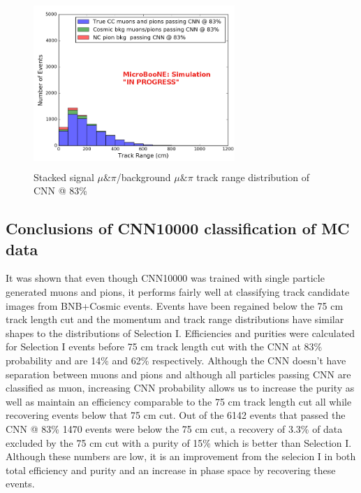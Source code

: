 \begin{figure}[htp!]
\centering
\includegraphics[width=3in,height=2.5in]{figs/sel1mod_trackrange_acc83.png}
	\caption{Stacked signal $\mu \& \pi$/background $\mu \& \pi$ track range distribution of CNN @ 83\%}
\label{fig:sel1mod_83}
\end{figure}
\subsection{Conclusions of CNN10000 classification of MC data}

It was shown that even though CNN10000 was trained with single particle generated muons and pions, it performs fairly well at classifying track candidate images from BNB+Cosmic events. Events have been regained below the 75 cm track length cut and the momentum and track range distributions have similar shapes to the distributions of Selection I. Efficiencies and purities were calculated for Selection I events before 75 cm track length cut  with the CNN at 83\% probability and are 14\% and 62\% respectively. Although the CNN doesn't have separation between muons and pions and although all particles passing CNN are classified as muon, increasing CNN probability allows us to increase the purity as well as maintain an efficiency comparable to the 75 cm track length cut all while recovering events below that 75 cm cut. Out of the 6142 events that passed the CNN @ 83\% 1470 events were below the 75 cm cut, a recovery of 3.3\% of data excluded by the 75 cm cut with a purity of 15\% which is better than Selection I. Although these numbers are low, it is an improvement from the selecion I in both total efficiency and purity and an increase in phase space by recovering these events. 

